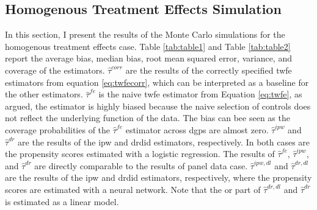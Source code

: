 \subsection{Homogenous Treatment Effects Simulation}



In this section, I present the results of the Monte Carlo simulations for the homogenous treatment effects case.
Table \ref{tab:table1} and Table \ref{tab:table2} report the average bias, median bias, root mean squared error, variance, and coverage of the estimators.
$\hat{\tau}^{corr}$ are the results of the correctly specified \ac{twfe} estimators from equation \ref{eq:twfecorr}, which can be interpreted as a baseline for the other estimators.
$\hat{\tau}^{fe}$ is the naive \ac{twfe} estimator from Equation \ref{eq:twfe}, as argued, the estimator is highly biased because the naive selection of controls does not reflect the underlying function of the data.
The bias can bee seen as the coverage probabilities of the $\hat{\tau}^{fe}$ estimator across \ac{dgp}s are almost zero.
$\hat{\tau}^{ipw}$ and $\hat{\tau}^{dr}$ are the results of the \ac{ipw} and \ac{drdid} estimators, respectively.
In both cases are the propensity scores estimated with a logistic regression.
The results of $\hat{\tau}^{fe}$, $\hat{\tau}^{ipw}$, and $\hat{\tau}^{dr}$ are directly comparable to the results of \citet{santannaDoublyRobustDifferenceindifferences2020} panel data case.
$\hat{\tau}^{ipw,dl}$ and $\hat{\tau}^{dr,dl}$ are the results of the \ac{ipw} and \ac{drdid} estimators, respectively, where the propensity scores are estimated with a neural network.
Note that the \ac{or} part of $\hat{\tau}^{dr,dl}$ and $\hat{\tau}^{dr}$ is estimated as a linear model.


